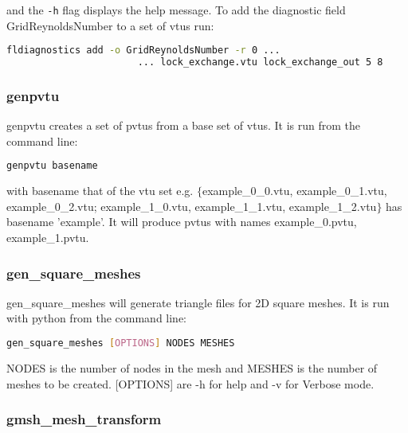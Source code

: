and the \lstinline[language = Bash]+-h+ flag displays the help message. To add the diagnostic field GridReynoldsNumber to a set of vtus run:

\begin{lstlisting}[language = Bash]
fldiagnostics add -o GridReynoldsNumber -r 0 ...
			           ... lock_exchange.vtu lock_exchange_out 5 8
\end{lstlisting}


\subsubsection{genpvtu}
\label{sect:genpvtu}
genpvtu creates a set of pvtus from a base set of vtus. It is run from the command line:
\begin{lstlisting}[language = Bash]
genpvtu basename 
\end{lstlisting}
with basename that of the vtu set e.g. $\{$example\_0\_0.vtu, example\_0\_1.vtu, example\_0\_2.vtu; example\_1\_0.vtu, example\_1\_1.vtu, example\_1\_2.vtu$\}$ has basename 'example'. It will produce pvtus with names example\_0.pvtu, example\_1.pvtu.


\subsubsection{gen\_square\_meshes}
\label{sect:gen_square_meshes}
gen\_square\_meshes will generate triangle files for 2D square meshes. It is run with python from the command line:
\begin{lstlisting}[language = Bash]
gen_square_meshes [OPTIONS] NODES MESHES 
\end{lstlisting} 
NODES is the number of nodes in the mesh and MESHES is the number of meshes to be created. [OPTIONS] are -h for help and -v for Verbose mode.


\subsubsection{gmsh\_mesh\_transform}
\label{sect:gmsh_mesh_transform}

